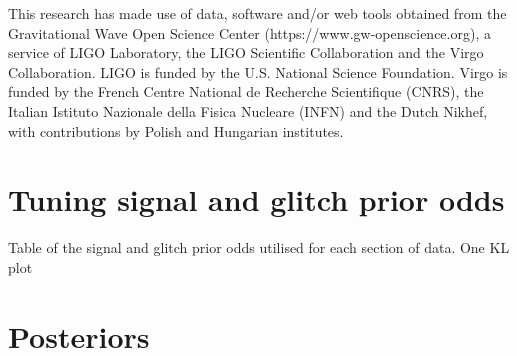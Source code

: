 \documentclass[%
 nofootinbib,
 amsmath,amssymb,
 aps,
 twocolumn
]{revtex4-2}
\begin{document}

\begin{acknowledgments}

This research has made use of data, software and/or web tools obtained from the Gravitational Wave Open Science Center (https://www.gw-openscience.org), a service of LIGO Laboratory, the LIGO Scientific Collaboration and the Virgo Collaboration. LIGO is funded by the U.S. National Science Foundation. Virgo is funded by the French Centre National de Recherche Scientifique (CNRS), the Italian Istituto Nazionale della Fisica Nucleare (INFN) and the Dutch Nikhef, with contributions by Polish and Hungarian institutes.


\end{acknowledgments}

\appendix

\section{Tuning signal and glitch prior odds} 

Table of the signal and glitch prior odds utilised for each section of data. One KL plot


\section{Posteriors}

\end{document}
